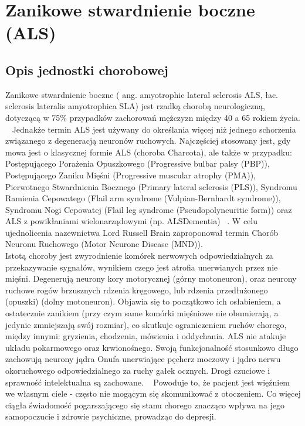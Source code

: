 \documentclass[twoside,a4paper]{book}
\begin{document}
\section{Zanikowe  stwardnienie boczne (ALS)}
\subsection{ Opis jednostki chorobowej}

Zanikowe stwardnienie boczne ( ang. amyotrophic lateral sclerosis ALS, łac. sclerosis lateralis
amyotrophica SLA) jest rzadką chorobą neurologiczną, dotyczącą  w 75\% przypadków zachorowań mężczyzn między 40 a 65 rokiem życia. ~\cite{neurology} Jednakże termin ALS jest używany do określania więcej niż jednego schorzenia związanego z degeneracją neuronów ruchowych.  Najczęściej stosowany jest, gdy mowa jest o klasycznej formie ALS (choroba Charcota), ale także w przypadku: Postępującego Porażenia Opuszkowego (Progressive bulbar palsy (PBP)), Postępującego Zaniku Mięśni (Progressive muscular atrophy (PMA)), Pierwotnego Stwardnienia Bocznego (Primary lateral sclerosis  (PLS)), Syndromu Ramienia Cepowatego (Flail arm syndrome (Vulpian-Bernhardt syndrome)), Syndromu Nogi Cepowatej (Flail leg syndrome  (Pseudopolyneuritic form)) oraz ALS  z powikłaniami wielonarządowymi  (np. ALSDementia) ~\cite{alsWij}. W celu ujednolicenia nazewnictwa Lord Russell Brain zaproponował termin Chorób Neuronu Ruchowego (Motor Neurone Disease (MND)). ~\cite{alsWij}\\
Istotą choroby jest zwyrodnienie komórek nerwowych odpowiedzialnych za przekazywanie sygnałów, wynikiem czego jest atrofia unerwianych przez nie mięśni. Degenerują neurony kory motorycznej (górny motoneuron), oraz neurony ruchowe rogów brzusznych rdzenia kręgowego, lub rdzenia przedłużonego (opuszki) (dolny motoneuron). Objawia się to początkowo ich osłabieniem, a ostatecznie zanikiem (przy czym same komórki mięśniowe nie obumierają, a jedynie zmniejszają swój rozmiar), co skutkuje ograniczeniem ruchów chorego, między innymi: gryzienia, chodzenia, mówienia i oddychania. ALS nie atakuje układu pokarmowego oraz krwionośnego. Swoją funkcjonalność stosunkowo długo zachowują neurony jądra Onufa unerwiające pęcherz moczowy i jądro nerwu okoruchowego odpowiedzialnego za ruchy gałek ocznych. Drogi czuciowe i sprawność intelektualna są zachowane. ~\cite{parkinsonALS} Powoduje to, że pacjent jest więźniem we własnym ciele - często nie mogącym się skomunikować z otoczeniem.  Co więcej ciągła świadomość pogarszającego się stanu chorego znacząco wpływa na jego samopoczucie i zdrowie psychiczne, prowadząc do depresji. \\
\end{document}
